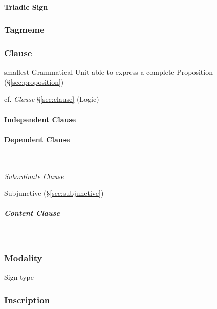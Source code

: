 \paragraph{Triadic Sign}\label{sec:triadic_sign}\hfill



\subsubsection{Tagmeme}\label{sec:tagmeme}

\subsubsection{Clause}\label{sec:grammatical_clause}

smallest Grammatical Unit able to express a complete Proposition
(\S\ref{sec:proposition})

cf. \emph{Clause} \S\ref{sec:clause} (Logic)



\paragraph{Independent Clause}\label{sec:independent_clause}\hfill

\paragraph{Dependent Clause}\label{sec:dependent_clause}\hfill \\\hfill

\emph{Subordinate Clause}

Subjunctive (\S\ref{sec:subjunctive})

\subparagraph{Content Clause}\label{sec:content_clause}\hfill \\\hfill



\subsubsection{Modality}\label{sec:syntax_modality}

Sign-type




\subsubsection{Inscription}\label{sec:inscription}

